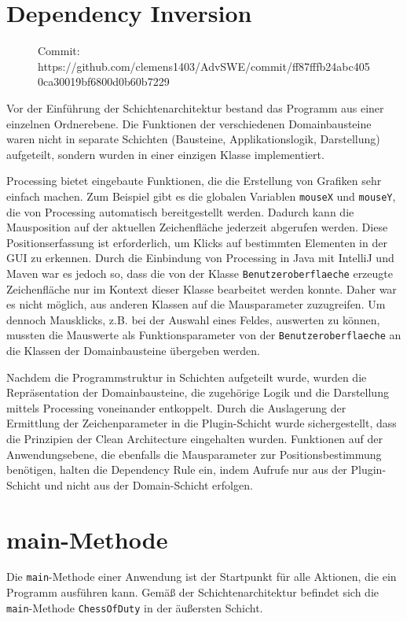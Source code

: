 \section{Dependency Inversion}

\begin{figure}[h!]
    Commit:  \scriptsize https://github.com/clemens1403/AdvSWE/commit/ff87fffb24abc4050ca30019bf6800d0b60b7229
\end{figure}

Vor der Einführung der Schichtenarchitektur bestand das Programm aus einer einzelnen Ordnerebene. 
Die Funktionen der verschiedenen Domainbausteine waren nicht in separate Schichten (Bausteine, Applikationslogik, Darstellung) aufgeteilt, sondern wurden in einer einzigen Klasse implementiert.

Processing bietet eingebaute Funktionen, die die Erstellung von Grafiken sehr einfach machen. 
Zum Beispiel gibt es die globalen Variablen \texttt{mouseX} und \texttt{mouseY}, die von Processing automatisch bereitgestellt werden. 
Dadurch kann die Mausposition auf der aktuellen Zeichenfläche jederzeit abgerufen werden. 
Diese Positionserfassung ist erforderlich, um Klicks auf bestimmten Elementen in der GUI zu erkennen. 
Durch die Einbindung von Processing in Java mit IntelliJ und Maven war es jedoch so, dass die von der Klasse \texttt{Benutzeroberflaeche} erzeugte Zeichenfläche nur im Kontext dieser Klasse bearbeitet werden konnte. 
Daher war es nicht möglich, aus anderen Klassen auf die Mausparameter zuzugreifen. 
Um dennoch Mausklicks, z.B. bei der Auswahl eines Feldes, auswerten zu können, mussten die Mauswerte als Funktionsparameter von der \texttt{Benutzeroberflaeche} an die Klassen der Domainbausteine übergeben werden.

Nachdem die Programmstruktur in Schichten aufgeteilt wurde, wurden die Repräsentation der Domainbausteine, die zugehörige Logik und die Darstellung mittels Processing voneinander entkoppelt. 
Durch die Auslagerung der Ermittlung der Zeichenparameter in die Plugin-Schicht wurde sichergestellt, dass die Prinzipien der Clean Architecture eingehalten wurden. 
Funktionen auf der Anwendungsebene, die ebenfalls die Mausparameter zur Positionsbestimmung benötigen, halten die Dependency Rule ein, indem Aufrufe nur aus der Plugin-Schicht und nicht aus der Domain-Schicht erfolgen.

\section{main-Methode}

Die \texttt{main}-Methode einer Anwendung ist der Startpunkt für alle Aktionen, die ein Programm ausführen kann. 
Gemäß der Schichtenarchitektur befindet sich die \texttt{main}-Methode \texttt{ChessOfDuty} in der äußersten Schicht.